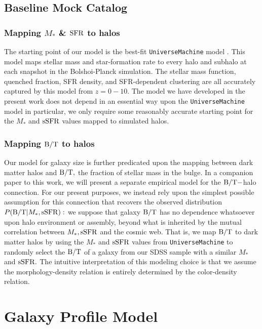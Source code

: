 \documentclass[usenatbib,usegraphicx,letterpaper]{mn2e}
\newcommand{\bt}{{\rm B/T}}
\newcommand{\mstar}{M_{\ast}}
\newcommand{\ssfr}{{\rm sSFR}}
\newcommand{\sfr}{{\rm SFR}}
\begin{document}
\subsection{Baseline Mock Catalog}
\label{subsec:baselinemock}

\subsubsection{Mapping $\mstar$ \& $\sfr$ to halos}
\label{subsubsec:umachine}

The starting point of our model is the best-fit {\tt UniverseMachine} model \citep[][in prep]{behroozi_etal17}. This model maps stellar mass and star-formation rate to every halo and subhalo at each snapshot in the Bolshoi-Planck simulation. The stellar mass function, quenched fraction, SFR density, and SFR-dependent clustering are all accurately captured by this model from $z=0-10.$ The model we have developed in the present work does not depend in an essential way upon the {\tt UniverseMachine} model in particular, we only require some reasonably accurate starting point for the $\mstar$ and $\ssfr$ values mapped to simulated halos. 

\subsubsection{Mapping $\bt$ to halos}
\label{subsubsec:random_bt_model}

Our model for galaxy size is further predicated upon the mapping between dark matter halos and $\bt,$ the fraction of stellar mass in the bulge. In a companion paper to this work, we will present a separate empirical model for the $\bt-$halo connection. For our present purposes, we instead rely upon the simplest possible assumption for this connection that recovers the observed distribution $P(\bt\vert\mstar,\ssfr):$ we suppose that galaxy $\bt$ has no dependence whatsoever upon halo environment or assembly, beyond what is inherited by the mutual correlation between $\mstar, \ssfr$ and the cosmic web. That is, we map $\bt$ to dark matter halos by using the $\mstar$ and $\ssfr$ values from {\tt UniverseMachine} to randomly select the $\bt$ of a galaxy from our SDSS sample with a similar $\mstar$ and $\ssfr.$ The intuitive interpretation of this modeling choice is that we assume the morphology-density relation is entirely determined by the color-density relation. 

\section{Galaxy Profile Model}
\label{sec:model}
\end{document}
